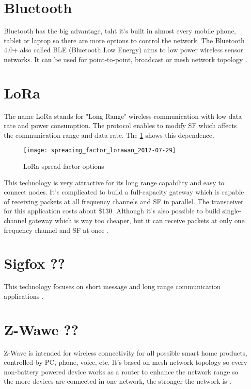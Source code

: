 \section{Bluetooth}
Bluetooth has the big advantage, taht it's built in almost every mobile phone, tablet or laptop so there are more options to control the network. The Bluetooth 4.0+ also called BLE (Bluetooth Low Energy) aims to low power wireless sensor networks.
It can be used for point-to-point, broadcast or mesh network topology \cite{13} \cite{14} \cite{15} \cite{16}.


\section{LoRa}
The name LoRa stands for "Long Range" wireless communication with low data rate and power consumption. The protocol enables to modify SF which affects the communication range and data rate. The \ref{fig:loraSF} shows this dependence.

\begin{figure}[!h]
    \centering
    \texttt{[image: spreading\_factor\_lorawan\_2017-07-29]}
    \caption{LoRa spread factor options \cite{24}}
    \label{fig:loraSF}
\end{figure}

This technology is very attractive for its long range capability and easy to connect nodes. It's complicated to build a full-capacity gateway which is capable of receiving packets at all frequency channels and SF in parallel. The transceiver for this application costs about \$130. Although it's also possible to build single-channel gateway which is way too cheaper, but it can receive packets at only one frequency channel and SF at once \cite{17} \cite{18} \cite{19} \cite{20} \cite{21} \cite{22} \cite{23} \cite{24}.


\section{Sigfox ??}
This technology focuses on short message and long range communication applications \cite{25} \cite{26}.


\section{Z-Wawe ??}
Z-Wave is intended for wireless connectivity for all possible smart home products, controlled by PC, phone, voice, etc. It's based on mesh network topology so every non-battery powered device works as a router to enhance the network range so the more devices are connected in one network, the stronger the network is \cite{27} \cite{28}.


